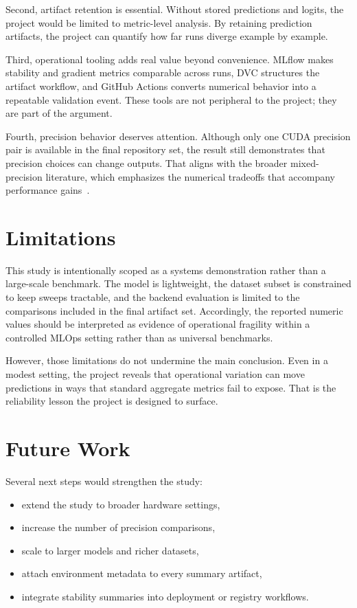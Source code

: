 \documentclass[conference]{IEEEtran}
\begin{document}
Second, artifact retention is essential. Without stored predictions and logits, the project would be limited to metric-level analysis. By retaining prediction artifacts, the project can quantify how far runs diverge example by example.

Third, operational tooling adds real value beyond convenience. MLflow makes stability and gradient metrics comparable across runs, DVC structures the artifact workflow, and GitHub Actions converts numerical behavior into a repeatable validation event. These tools are not peripheral to the project; they are part of the argument.

Fourth, precision behavior deserves attention. Although only one CUDA precision pair is available in the final repository set, the result still demonstrates that precision choices can change outputs. That aligns with the broader mixed-precision literature, which emphasizes the numerical tradeoffs that accompany performance gains~\cite{micikevicius2018}.

\section{Limitations}

This study is intentionally scoped as a systems demonstration rather than a large-scale benchmark. The model is lightweight, the dataset subset is constrained to keep sweeps tractable, and the backend evaluation is limited to the comparisons included in the final artifact set. Accordingly, the reported numeric values should be interpreted as evidence of operational fragility within a controlled MLOps setting rather than as universal benchmarks.

However, those limitations do not undermine the main conclusion. Even in a modest setting, the project reveals that operational variation can move predictions in ways that standard aggregate metrics fail to expose. That is the reliability lesson the project is designed to surface.

\section{Future Work}

Several next steps would strengthen the study:
\begin{itemize}
\item extend the study to broader hardware settings,
\item increase the number of precision comparisons,
\item scale to larger models and richer datasets,
\item attach environment metadata to every summary artifact,
\item integrate stability summaries into deployment or registry workflows.
\end{itemize}
\end{document}
